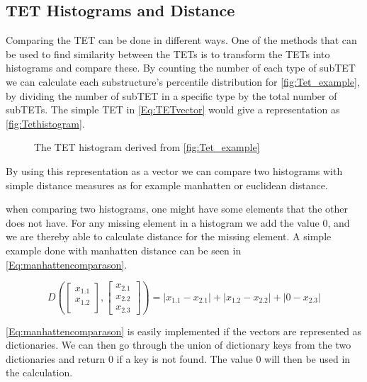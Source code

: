 \subsection{TET Histograms and Distance}
	Comparing the TET can be done in different ways. One of the methods that can be used to find similarity between the TETs is to transform the TETs into histograms and compare these\cite{JAEGER201330}. By counting the number of each type of subTET we can calculate each substructure's percentile distribution for \autoref{fig:Tet_example}, by dividing the number of subTET in a specific type by the total number of subTETs. The simple TET in \autoref{Eq:TETvector} would give a representation as \autoref{fig:Tethistogram}.

	\begin{figure}[H]
		\centering
		\begin{adjustbox}{width=0.5\textwidth}
			
		\end{adjustbox}
		\caption{The TET histogram derived from \autoref{fig:Tet_example}}
		\label{fig:Tethistogram}
	\end{figure}

	By using this representation as a vector we can compare two histograms with simple distance measures as for example manhatten or euclidean distance.

	when comparing two histograms, one might have some elements that the other does not have. For any missing element in a histogram we add the value $0$, and we are thereby able to calculate distance for the missing element. A simple example done with manhatten distance can be seen in \autoref{Eq:manhattencomparason}\cite{singh2013k}.

	\begin{equation}\label{Eq:manhattencomparason}
	D(\begin{bmatrix}
	x_{1.1} \\
	x_{1.2} \\
	\end{bmatrix},
	\begin{bmatrix}
	x_{2.1} \\
	x_{2.2} \\
	x_{2.3}
	\end{bmatrix})= |x_{1.1} - x_{2.1}| + |x_{1.2} - x_{2.2}| + |0 - x_{2.3}|
	\end{equation}

	\autoref{Eq:manhattencomparason} is easily implemented if the vectors are represented as dictionaries. We can then go through the union of dictionary keys from the two dictionaries and return $0$ if a key is not found. The value $0$ will then be used in the calculation.
